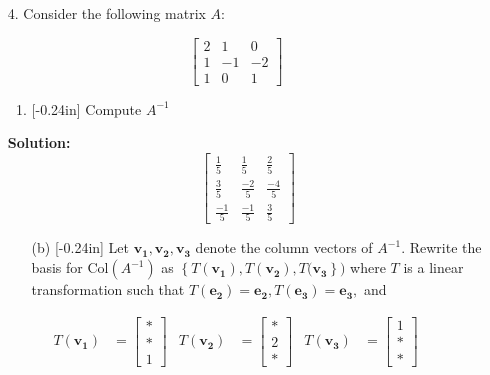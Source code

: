 \documentclass[letterpaper,12pt]{article}
\newcommand{\set}[1]{\left\{ #1 \right\}}
\theoremstyle{definition}
\begin{document}
\pagebreak
\begin{enumerate}
    \item[4.]  Consider the following matrix $A:$ \end{enumerate}
     $$\begin{bmatrix}
        2 & 1 & 0  \\
        1 & -1 & -2 \\
        1 & 0 & 1 
    \end{bmatrix}$$
\begin{enumerate}
\item[]
    \begin{enumerate}
        \item\reversemarginpar{}[-0.24in] Compute $A^{-1}$
    \end{enumerate}
    \begin{mdframed}
        \textbf{Solution:}
        $$\begin{bmatrix}
            \frac{1}{5} &  \frac{1}{5} &  \frac{2}{5} \\
             \frac{3}{5} &  \frac{-2}{5} &  \frac{-4}{5} \\
              \frac{-1}{5} &  \frac{-1}{5} &  \frac{3}{5}
        \end{bmatrix}$$
    \end{mdframed}
\end{enumerate}
\pagebreak
\begin{enumerate}
    \item[]\begin{enumerate}
        \item[(b)]\reversemarginpar{}[-0.24in] Let $\mathbf{v_1}, \mathbf{v_2},\mathbf{v_3}$ denote the column vectors of $A^{-1}$. Rewrite the basis for $\mathrm{Col}(A^{-1})$ as $\set{T(\mathbf{v_1}),T(\mathbf{v_2}),T(\mathbf{v_3}})$ where $T$ is a linear transformation such that $T(\mathbf{e_2})=\mathbf{e_2},T(\mathbf{e_3})=\mathbf{e_3},$ and 
    \end{enumerate}
\end{enumerate}
\begin{align*}
            T(\mathbf{v_1}) &=\begin{bmatrix}
                * \\ * \\ 1
            \end{bmatrix} & T(\mathbf{v_2}) &=\begin{bmatrix}
                * \\ 2 \\ *
            \end{bmatrix} & T(\mathbf{v_3}) &=\begin{bmatrix}
                1 \\ * \\ *
            \end{bmatrix}
        \end{align*}
\end{document}
